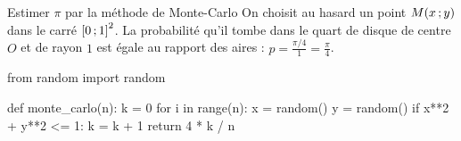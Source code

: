 \begin{exercice}[3]{Estimer $\pi$ par la méthode de Monte-Carlo}
On choisit au hasard un point $M(x\,{;}\, y)$ dans le carré $\mathopen{[}0\,{;}\,1\mathclose{]}^{2}$. La probabilité qu'il tombe dans le quart de disque de centre
$O$ et de rayon $1$ est égale au rapport des aires : $p=\frac{\pi/4}{1}=\frac{\pi}{4}$.
\begin{codecote}[0.5]
\begin{pythoncol}
from random import random

def monte_carlo(n):
    k = 0
    for i in range(n):
        x = random()
        y = random()
        if x**2 + y**2 <= 1:
            k = k + 1
    return 4 * k / n
\end{pythoncol}
\cote
\centering
\begin{tikzpicture}
\begin{axis}[otSchema, width=52mm, height=52mm, xmin=0, xmax=1, ymin=0, ymax=1, xtick={0,1}, ytick={1},
  axis lines=box, axis line style={otMuted,line width=0.5pt,-}]

\end{axis}
\end{tikzpicture}
\end{codecote}
\end{exercice}
